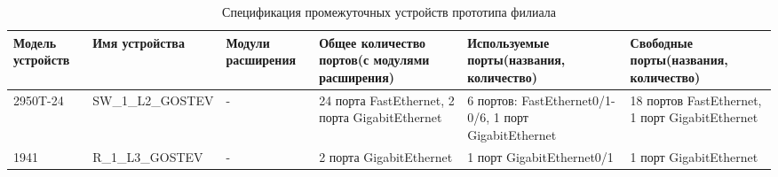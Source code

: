 \documentclass[14pt, a4paper]{extarticle}
\numberwithin{equation}{section}
\begin{document}
\begin{landscape}
\begin{table}[H]
\centering
\small
\caption{Спецификация промежуточных устройств прототипа филиала}
\begin{tabular}{|m{2.5cm}|m{4cm}|m{3cm}|m{4.2cm}|m{5.3cm}|m{4cm}|}
\hline
\textbf{Модель устройств} & \textbf{Имя устройства} & \textbf{Модули расширения} & \textbf{Общее количество портов(с модулями расширения)} & \textbf{Используемые порты(названия, количество)} & \textbf{Свободные порты(названия, количество)} \\
\hline
2950T-24 &
SW\_1\_L2\_GOSTEV &
- &
24 порта FastEthernet, 2 порта GigabitEthernet &
6 портов: FastEthernet0/1-0/6, 1 порт GigabitEthernet &
18 портов FastEthernet, 1 порт GigabitEthernet \\
\hline
1941 &
R\_1\_L3\_GOSTEV &
- &
2 порта GigabitEthernet &
1 порт GigabitEthernet0/1 &
1 порт GigabitEthernet \\
\hline
\end{tabular}
\end{table}
\end{landscape}



\begingroup
\let\itshape\upshape
\sloppy
\printbibliography[title=СПИСОК ИСПОЛЬЗУЕМЫХ ИСТОЧНИКОВ]
\endgroup
\end{document}
